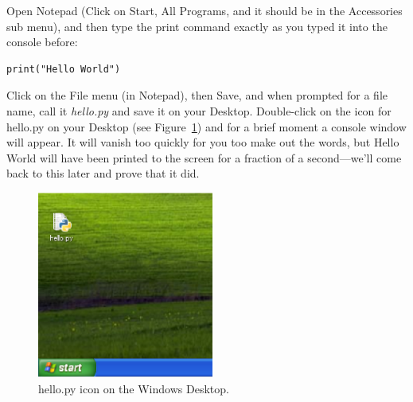 \begin{WINDOWS}
Open Notepad (Click on Start, All Programs, and it should be in the Accessories sub menu), and then type the print command exactly as you typed it into the console before:

\begin{listing}
\begin{verbatim}
print("Hello World")
\end{verbatim}
\end{listing}

Click on the File menu (in Notepad), then Save, and when prompted for a file name, call it \emph{hello.py} and save it on your Desktop. Double-click on the icon for hello.py on your Desktop (see Figure~\ref{fig5}) and for a brief moment a console window will appear.  It will vanish too quickly for you too make out the words, but Hello World will have been printed to the screen for a fraction of a second---we'll come back to this later and prove that it did.\\

\begin{figure}
\begin{center}
\includegraphics[width=58mm]{eps/figure5.eps}
\end{center}
\caption{hello.py icon on the Windows Desktop.}\label{fig5}
\end{figure}
\end{WINDOWS}

